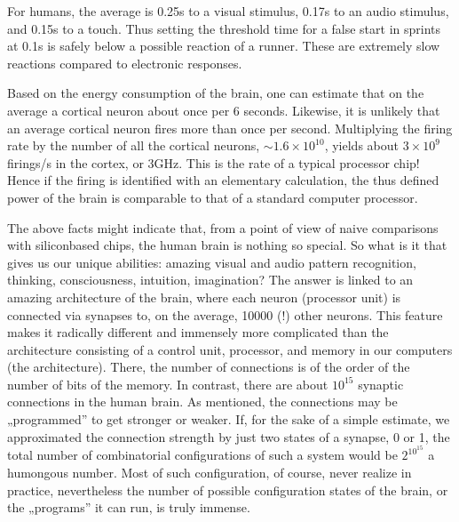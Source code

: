 \documentclass[a4paper,12pt,polish]{jupyterBook}
\begin{document}
\sphinxAtStartPar
For humans, the average  is 0.25s to a visual stimulus, 0.17s to an audio stimulus, and 0.15s to a touch. Thus setting the threshold time for a false start in sprints at 0.1s is safely below a possible reaction of a runner. These are extremely slow reactions compared to electronic responses.

\sphinxAtStartPar
Based on the energy consumption of the brain, one can estimate that on the average a cortical neuron  about once per 6 seconds. Likewise, it is unlikely that an average cortical neuron fires more than once per second. Multiplying the firing rate by the number of all the cortical neurons, \(\sim 1.6 \times 10^{10}\), yields about \(3 \times 10^{9}\) firings/s in the cortex, or 3GHz. This is the rate of a typical processor chip! Hence if the firing is identified with an elementary calculation, the thus defined power of the brain is comparable to that of a standard computer processor.

\sphinxAtStartPar
The above facts might indicate that, from a point of view of naive comparisons with silicon\sphinxhyphen{}based chips, the human brain is nothing so special. So what is it that gives us our unique abilities: amazing visual and audio pattern recognition, thinking, consciousness, intuition, imagination? The answer is linked to an amazing architecture of the brain, where each neuron (processor unit) is connected via synapses to, on the average, 10000 (!) other neurons. This feature makes it radically different and immensely more complicated than the architecture consisting of a control unit, processor, and memory in our computers (the  architecture). There, the number of connections is of the order of the number of bits of the memory. In contrast, there are about \(10^{15}\) synaptic connections in the human brain. As mentioned, the connections may be „programmed” to get stronger or weaker. If, for the sake of a simple estimate, we approximated the connection strength by just two states of a synapse, 0 or 1, the total number of combinatorial configurations of such a system would be \(2^{10^{15}}\) \sphinxhyphen{} a humongous number. Most of such configuration, of course, never realize in practice, nevertheless the number of possible configuration states of the brain, or the „programs” it can run, is truly immense.
\end{document}
